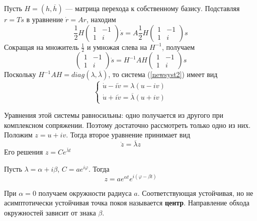 \documentclass{article}
\begin{document}
Пусть $H = (h, \overline{h})$ --- матрица перехода к собственному базису. Подставляя $r = Ts$ в уравнение $\dot{r} = Ar$, находим
\begin{equation*}
    \frac{1}{2}H
    \begin{pmatrix}
    1 & -1\\
    1 & i
    \end{pmatrix}
    \dot{s} = A\frac{1}{2}H
    \begin{pmatrix}
    1 & -1\\
    1 & i
    \end{pmatrix}
    s
\end{equation*}
Сокращая на множитель $\frac{1}{2}$ и умножая слева на $H^{-1}$, получаем
\begin{equation}
    \begin{pmatrix}
    1 & -1\\
    1 & i
    \end{pmatrix}
    \dot{s} = H^{-1}AH
    \begin{pmatrix}
    1 & -1\\
    1 & i
    \end{pmatrix}
    s \label{newsyst2}
\end{equation}
Поскольку $H^{-1}AH = diag(\lambda, \overline{\lambda})$, то система (\ref{newsyst2}) имеет вид
\begin{equation*}
    \begin{cases}
    \dot{u} - i\dot{v} = \lambda(u - iv)\\
    \dot{u} + i\dot{v} = \overline{\lambda}(u + iv)
    \end{cases}
\end{equation*}

Уравнения этой системы равносильны: одно получается из другого при комплексном сопряжении. Поэтому достаточно рассмотреть только одно из них. Положим $z = u + iv$. Тогда второе уравнение принимает вид
\begin{equation*}
    \dot{z} = \overline{\lambda}z
\end{equation*}
Его решения $z = Ce^{\overline{\lambda}t}$

Пусть $\lambda = \alpha + i\beta$, $C = ae^{i\varphi}$. Тогда
\begin{equation*}
    z = ae^{\alpha t}e^{i(\varphi - \beta t)}
\end{equation*}

При $\alpha = 0$ получаем окружности радиуса $a$. Соответствующая устойчивая, но не асимптотически устойчивая точка покоя называется \textbf{центр}. Направление обхода окружностей зависит от знака $\beta$.
\end{document}
